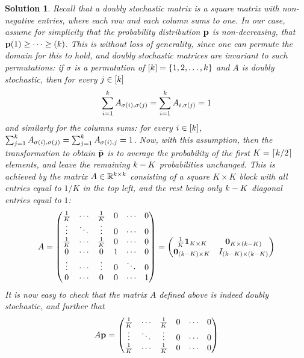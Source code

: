 \documentclass[biber,plain]{nowfnt} %
\newtheorem{solution}{Solution}[chapter]
\begin{document}
\begin{solution}
Recall that a doubly stochastic matrix is a square matrix with non-negative entries, where each row and each column sums to one. In our case, assume for simplicity that the probability distribution $\mathbf{p}$ is non-decreasing, \ie that $\mathbf{p}(1)\geq \dots \geq(k)$. This is without loss of generality, since one can permute the domain for this to hold, and doubly stochastic matrices are invariant to such permutations: if $\sigma$ is a permutation of $[k]=\{1,2,\dots,k\}$ and $A$ is doubly stochastic, then for every $j\in[k]$
\[
	\sum_{i=1}^k A_{\sigma(i),\sigma(j)} = \sum_{i=1}^k A_{i,\sigma(j)} = 1
\]
and similarly for the columns sums: for every $i\in[k]$, $\sum_{j=1}^k A_{\sigma(i),\sigma(j)} = \sum_{j=1}^k A_{\sigma(i), j} = 1$. Now, with this assumption, then the transformation to obtain $\bar{\mathbf{p}}$ is to average the probability of the first $K=\clg{\ab/2}$ elements, and leave the remaining $k-K$ probabilities unchanged. This is achieved by the matrix $A\in\mathbb{R}^{k\times k}$ consisting of a square $K\times K$ block with all entries equal to $1/K$ in the top left, and the rest being only $k-K$ diagonal entries equal to $1$:
\[
	A = 
	\begin{pmatrix}
	\frac{1}{K} & \cdots & \frac{1}{K} & 0 &\cdots & 0\\
	\vdots & \ddots & \vdots & 0 &\cdots & 0\\
	\frac{1}{K} & \cdots & \frac{1}{K} & 0 &\cdots & 0\\
	0 & \cdots & 0 & 1 &\cdots & 0\\
	\vdots & \cdots & \vdots & 0 &\ddots & 0\\
	0 & \cdots & 0 & 0 &\cdots & 1\\
	\end{pmatrix} =
	\begin{pmatrix}
	\frac{1}{K} \mathbf{1}_{K\times K} & \mathbf{0}_{K\times (k-K)} \\
	\mathbf{0}_{(k-K)\times K} & {I}_{(k-K)\times (k-K)} \\
	\end{pmatrix}
\]
It is now easy to check that the matrix $A$ defined above is indeed doubly stochastic, and further that
\[
	A \mathbf{p} = 	\begin{pmatrix}
	\frac{1}{K} & \cdots & \frac{1}{K} & 0 &\cdots & 0\\
	\vdots & \ddots & \vdots & 0 &\cdots & 0\\
	\frac{1}{K} & \cdots & \frac{1}{K} & 0 &\cdots & 0\\

\end{pmatrix}\]
\end{solution}
\end{document}
